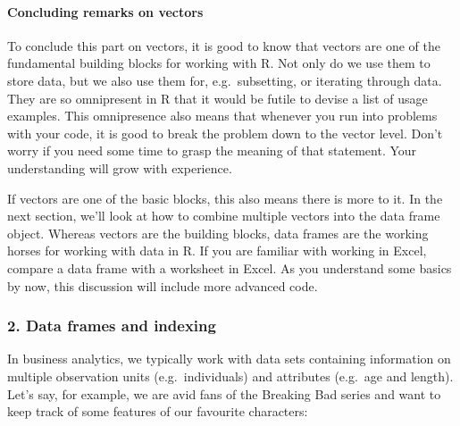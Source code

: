 \documentclass[
]{article}
\begin{document}
\hypertarget{concluding-remarks-on-vectors}{%
\paragraph{Concluding remarks on
vectors}\label{concluding-remarks-on-vectors}}

To conclude this part on vectors, it is good to know that vectors are
one of the fundamental building blocks for working with R. Not only do
we use them to store data, but we also use them for, e.g.~subsetting, or
iterating through data. They are so omnipresent in R that it would be
futile to devise a list of usage examples. This omnipresence also means
that whenever you run into problems with your code, it is good to break
the problem down to the vector level. Don't worry if you need some time
to grasp the meaning of that statement. Your understanding will grow
with experience.

If vectors are one of the basic blocks, this also means there is more to
it. In the next section, we'll look at how to combine multiple vectors
into the data frame object. Whereas vectors are the building blocks,
data frames are the working horses for working with data in R. If you
are familiar with working in Excel, compare a data frame with a
worksheet in Excel. As you understand some basics by now, this
discussion will include more advanced code.

\hypertarget{data-frames-and-indexing}{%
\subsubsection{2. Data frames and
indexing}\label{data-frames-and-indexing}}

In business analytics, we typically work with data sets containing
information on multiple observation units (e.g.~individuals) and
attributes (e.g.~age and length). Let's say, for example, we are avid
fans of the Breaking Bad series and want to keep track of some features
of our favourite characters:
\end{document}
